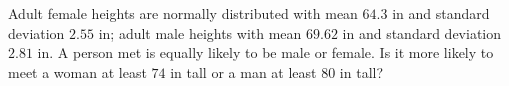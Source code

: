 Adult female heights are normally distributed with mean $64.3$ in and standard deviation $2.55$ in; adult male heights with mean $69.62$ in and standard deviation $2.81$ in. A person met is equally likely to be male or female. Is it more likely to meet a woman at least $74$ in tall or a man at least $80$ in tall?
